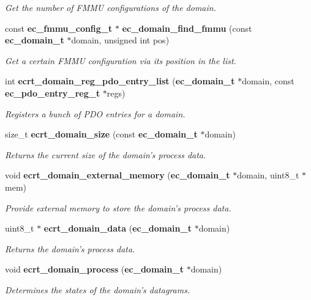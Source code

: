\begin{DoxyCompactItemize}
\begin{DoxyCompactList}\small\item\em \-Get the number of \-F\-M\-M\-U configurations of the domain. \end{DoxyCompactList}\item 
const {\bf ec\-\_\-fmmu\-\_\-config\-\_\-t} $\ast$ {\bf ec\-\_\-domain\-\_\-find\-\_\-fmmu} (const {\bf ec\-\_\-domain\-\_\-t} $\ast$domain, unsigned int pos)
\begin{DoxyCompactList}\small\item\em \-Get a certain \-F\-M\-M\-U configuration via its position in the list. \end{DoxyCompactList}\item 
int {\bf ecrt\-\_\-domain\-\_\-reg\-\_\-pdo\-\_\-entry\-\_\-list} ({\bf ec\-\_\-domain\-\_\-t} $\ast$domain, const {\bf ec\-\_\-pdo\-\_\-entry\-\_\-reg\-\_\-t} $\ast$regs)
\begin{DoxyCompactList}\small\item\em \-Registers a bunch of \-P\-D\-O entries for a domain. \end{DoxyCompactList}\item 
size\-\_\-t {\bf ecrt\-\_\-domain\-\_\-size} (const {\bf ec\-\_\-domain\-\_\-t} $\ast$domain)
\begin{DoxyCompactList}\small\item\em \-Returns the current size of the domain's process data. \end{DoxyCompactList}\item 
void {\bf ecrt\-\_\-domain\-\_\-external\-\_\-memory} ({\bf ec\-\_\-domain\-\_\-t} $\ast$domain, uint8\-\_\-t $\ast$mem)
\begin{DoxyCompactList}\small\item\em \-Provide external memory to store the domain's process data. \end{DoxyCompactList}\item 
uint8\-\_\-t $\ast$ {\bf ecrt\-\_\-domain\-\_\-data} ({\bf ec\-\_\-domain\-\_\-t} $\ast$domain)
\begin{DoxyCompactList}\small\item\em \-Returns the domain's process data. \end{DoxyCompactList}\item 
void {\bf ecrt\-\_\-domain\-\_\-process} ({\bf ec\-\_\-domain\-\_\-t} $\ast$domain)
\begin{DoxyCompactList}\small\item\em \-Determines the states of the domain's datagrams. \end{DoxyCompactList}\item 

\end{DoxyCompactItemize}
